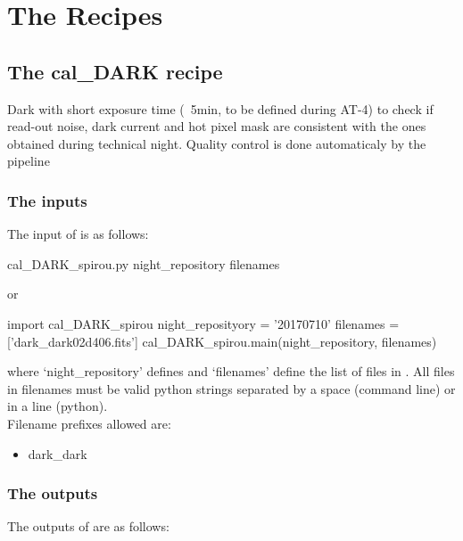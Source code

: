 \chapter{The Recipes}
\label{ch:the_recipes}


\clearpage
\newpage
\section{The cal\_DARK recipe}
\label{ch:the_recipes:cal_DARK_spirou}

Dark with short exposure time (~5min, to be defined during AT-4) to check if read-out noise, dark current and hot pixel mask are consistent with the ones obtained during technical night. Quality control is done automaticaly by the pipeline \\


\subsection{The inputs}
The input of \calDARK is as follows:
\begin{cmdbox}
cal_DARK_spirou.py  night_repository  filenames
\end{cmdbox}
\noindent or
\begin{pythonbox}
import cal_DARK_spirou
night_reposityory = '20170710'
filenames = ['dark_dark02d406.fits']
cal_DARK_spirou.main(night_repository, filenames)
\end{pythonbox}

\noindent where `night\_repository' defines \argnightname and `filenames' define the list of files in \argfilenames. All files in filenames must be valid python strings separated by a space (command line) or in a line (python). \\

\noindent Filename prefixes allowed are:
\begin{itemize}
	\item dark\_dark
\end{itemize}

\subsection{The outputs}
The outputs of \calDARK are as follows:

